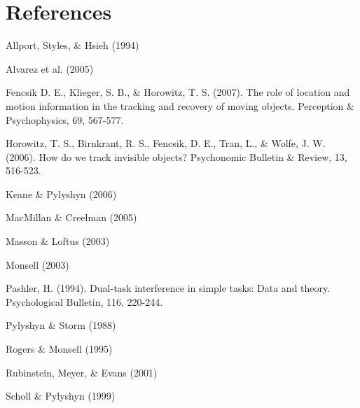 \documentclass[doc]{apa}
\begin{document}
\section{References}

Allport, Styles, \& Hsieh (1994)

Alvarez et al. (2005)

Fencsik D. E., Klieger, S. B., \& Horowitz, T. S. (2007). The role of
location and motion information in the tracking and recovery of moving
objects. Perception \& Psychophysics, 69, 567-577.

Horowitz, T. S., Birnkrant, R. S., Fencsik, D. E., Tran, L., \& Wolfe,
J. W. (2006). How do we track invisible objects? Psychonomic Bulletin \&
Review, 13, 516-523.

Keane \& Pylyshyn (2006)

MacMillan \& Creelman (2005)

Masson \& Loftus (2003)

Monsell (2003)

Pashler, H. (1994). Dual-task interference in simple tasks: Data and
theory. Psychological Bulletin, 116, 220-244.

Pylyshyn \& Storm (1988)

Rogers \& Monsell (1995)

Rubinstein, Meyer, \& Evans (2001)

Scholl \& Pylyshyn (1999)
\end{document}
